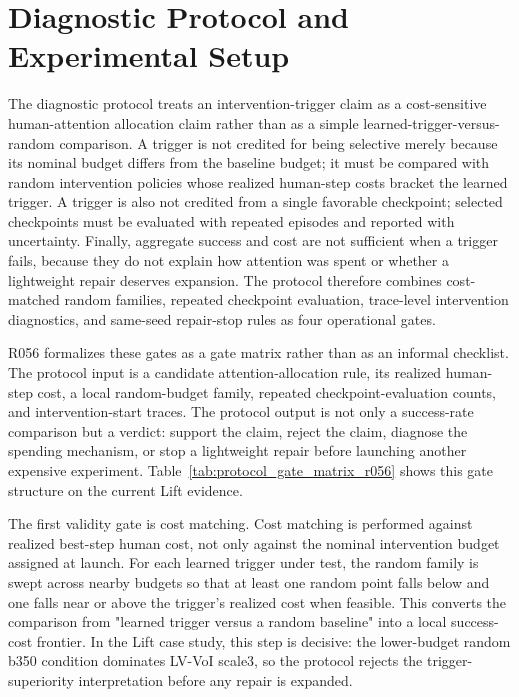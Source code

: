 \section{Diagnostic Protocol and Experimental Setup}

The diagnostic protocol treats an intervention-trigger claim as a cost-sensitive human-attention allocation claim rather than as a simple learned-trigger-versus-random comparison. A trigger is not credited for being selective merely because its nominal budget differs from the baseline budget; it must be compared with random intervention policies whose realized human-step costs bracket the learned trigger. A trigger is also not credited from a single favorable checkpoint; selected checkpoints must be evaluated with repeated episodes and reported with uncertainty. Finally, aggregate success and cost are not sufficient when a trigger fails, because they do not explain how attention was spent or whether a lightweight repair deserves expansion. The protocol therefore combines cost-matched random families, repeated checkpoint evaluation, trace-level intervention diagnostics, and same-seed repair-stop rules as four operational gates.

R056 formalizes these gates as a gate matrix rather than as an informal checklist. The protocol input is a candidate attention-allocation rule, its realized human-step cost, a local random-budget family, repeated checkpoint-evaluation counts, and intervention-start traces. The protocol output is not only a success-rate comparison but a verdict: support the claim, reject the claim, diagnose the spending mechanism, or stop a lightweight repair before launching another expensive experiment. Table~\ref{tab:protocol_gate_matrix_r056} shows this gate structure on the current Lift evidence.



The first validity gate is cost matching. Cost matching is performed against realized best-step human cost, not only against the nominal intervention budget assigned at launch. For each learned trigger under test, the random family is swept across nearby budgets so that at least one random point falls below and one falls near or above the trigger's realized cost when feasible. This converts the comparison from "learned trigger versus a random baseline" into a local success-cost frontier. In the Lift case study, this step is decisive: the lower-budget random b350 condition dominates LV-VoI scale3, so the protocol rejects the trigger-superiority interpretation before any repair is expanded.

